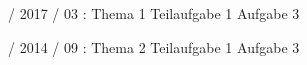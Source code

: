 \documentclass{lehramt-informatik-haupt}
\begin{document}
%

 / 2017 / 03 : Thema 1 Teilaufgabe 1 Aufgabe 3

%

 / 2014 / 09 : Thema 2 Teilaufgabe 1 Aufgabe 3

\literatur
\end{document}
